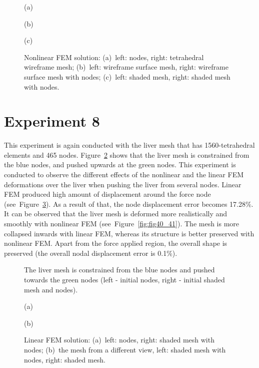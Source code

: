 \begin{figure}[h]
\centerline{}
\centerline{(a)}
\centerline{}
\centerline{(b)}
\centerline{}
\centerline{(c)}
\caption{Nonlinear FEM solution: (a)~left: nodes, right: tetrahedral wireframe mesh;
                                 (b)~left: wireframe surface mesh, right: wireframe surface mesh with nodes;
                                 (c)~left: shaded mesh, right: shaded mesh with nodes.}
\label{fig:fig34_35_36}
\end{figure}

\clearpage
\section{Experiment 8}
\label{viii}
This experiment is again conducted with the liver mesh that has 1560-tetrahedral elements and 465 nodes. Figure~\ref{fig:fig37} shows that the liver mesh is constrained from the blue nodes, and pushed upwards at the green nodes. This experiment is conducted to observe the different effects of the nonlinear and the linear FEM deformations over the liver when pushing the liver from several nodes. Linear FEM produced high amount of displacement around the force node (see~Figure~\ref{fig:fig38_39}). As a result of that, the node displacement error becomes 17.28\%. It can be observed that the liver mesh is deformed more realistically and smoothly with nonlinear FEM (see~Figure~\ref{fig:fig40_41}). The mesh is more collapsed inwards with linear FEM, whereas its structure is better preserved with nonlinear FEM. Apart from the force applied region, the overall shape is preserved (the overall nodal displacement error is 0.1\%).


\begin{figure}[h]
\centerline{}
\caption{The liver mesh is constrained from the blue nodes and pushed towards the green nodes (left - initial nodes, right - initial shaded mesh and nodes).}
\label{fig:fig37}
\end{figure}

\begin{figure}[h]
\centerline{}
\centerline{(a)}
\centerline{}
\centerline{(b)}
\caption{Linear FEM solution: (a)~left: nodes, right: shaded mesh with nodes; (b)~the mesh from a different view, left: shaded mesh with nodes, right: shaded mesh.}
\label{fig:fig38_39}
\end{figure}

